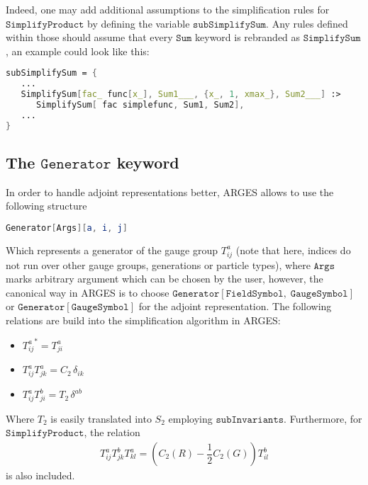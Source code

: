 \documentclass{scrartcl}
\begin{document}
Indeed, one may add additional assumptions to the simplification rules for $\mathtt{SimplifyProduct}$ by defining the variable $\mathtt{subSimplifySum}$. Any rules defined within those should assume that every $\mathtt{Sum}$ keyword is rebranded as $\mathtt{SimplifySum}$, an example could look like this:
\begin{lstlisting}[language=mathematica,mathescape,columns=flexible,backgroundcolor=\color{light-gray}]
subSimplifySum = {
   ...
   SimplifySum[fac_ func[x_], Sum1___, {x_, 1, xmax_}, Sum2___] :> 
      SimplifySum[ fac simplefunc, Sum1, Sum2],
   ...
}
\end{lstlisting}
\subsection{The $\mathtt{Generator}$ keyword}
In order to handle adjoint representations better, ARGES allows to use the following structure
\begin{lstlisting}[language=mathematica,mathescape,columns=flexible,backgroundcolor=\color{light-gray}]
Generator[Args][a, i, j]
\end{lstlisting}
Which represents a generator of the gauge group $T^a_{ij}$ (note that here, indices do not run over other gauge groups, generations or particle types), where $\mathtt{Args}$ marks arbitrary argument which can be chosen by the user, however, the canonical way in ARGES is to choose $\mathtt{Generator}[\mathtt{FieldSymbol},\;\mathtt{GaugeSymbol}]$ or $\mathtt{Generator}[\mathtt{GaugeSymbol}]$ for the adjoint representation.
The following relations are build into the simplification algorithm in ARGES:
\begin{itemize}
\item ${T^a_{ij}}^* = T^a_{ji}$
\item $T^a_{ij} T^a_{jk} = C_2\, \delta_{ik}$
\item $T^a_{ij} T^b_{ji} = T_2\, \delta^{ab}$
\end{itemize}
Where $T_2$ is easily translated into $S_2$ employing $\mathtt{subInvariants}$. Furthermore, for $\mathtt{SimplifyProduct}$, the relation
\begin{align*}
T^a_{ij} T^b_{jk} T^a_{kl} = \left(C_2(R) - \dfrac{1}{2} C_2(G)\right) T^b_{il}
\end{align*}
is also included.
\newpage
\end{document}
